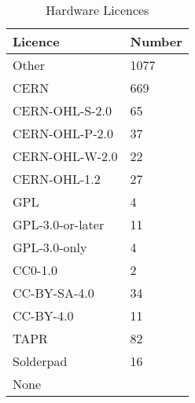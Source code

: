 \documentclass[final-report.tex]{subfiles}
\begin{document}
\begin{table*}[h!]
        \centering
        \begin{tabular}{| l | l |}
        \toprule
                Licence & Number \\
        \midrule
        \midrule
            Other & 1077 \\
        \midrule
            CERN & 669 \\
            CERN-OHL-S-2.0 & 65 \\
            CERN-OHL-P-2.0 & 37 \\
            CERN-OHL-W-2.0 & 22 \\
            CERN-OHL-1.2 & 27 \\
        \midrule
            GPL & 4 \\
            GPL-3.0-or-later & 11 \\
            GPL-3.0-only & 4 \\
        \midrule
            CC0-1.0 & 2 \\
            CC-BY-SA-4.0 & 34 \\
            CC-BY-4.0 & 11 \\
        \midrule
            TAPR & 82 \\
            Solderpad & 16 \\
        \midrule
            None &  \\
        \bottomrule
        \end{tabular}
        \caption{Hardware Licences}
        \label{tab:hlic}
\end{table*}
\end{document}
